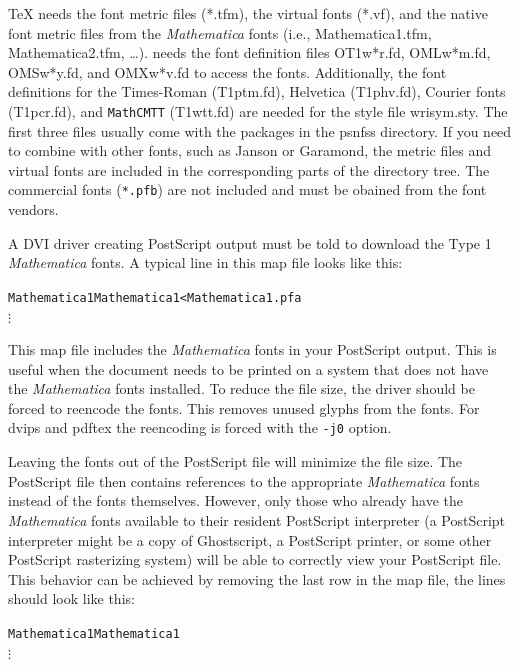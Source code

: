 \documentclass{article}
\newcommand{\Janson}[1]{{\fontfamily{pjn}\fontencoding{T1}%
\fontshape{n}\selectfont #1}}
\newcommand{\Garamond}[1]{{\fontfamily{pad}\fontencoding{T1}%
\fontshape{n}\selectfont #1}}
\newcommand{\cmtt}{\texttt{MathCMTT}\xspace}
\newcommand{\Math}{\textit{Mathematica}\xspace}
\begin{document}
\begin{sloppypar}
\TeX{} needs the font metric files (\textsf{*.tfm}), the virtual fonts
(\textsf{*.vf}), and the native font metric files from the \Math{}
fonts (i{.}e{.}, \textsf{Mathematica1.tfm}, \textsf{Mathematica2.tfm},
\ldots).  \LaTeXe{} needs the font definition files
\textsf{OT1w*r.fd}, \textsf{OMLw*m.fd}, \textsf{OMSw*y.fd}, and
\textsf{OMXw*v.fd} to access the fonts. Additionally, the font
definitions for the Times-Roman (\textsf{T1ptm.fd}), Helvetica
(\textsf{T1phv.fd}), Courier fonts (\textsf{T1pcr.fd}), and \cmtt
(\textsf{T1wtt.fd}) are needed for the style file
\textsf{wrisym.sty}. The first three files usually come with the
\LaTeXe{} packages in the \textsf{psnfss} directory.  If you need to
combine with other fonts, such as \Janson{Janson} or
\Garamond{Garamond}, the metric files and virtual fonts are included
in the corresponding parts of the directory tree.  The commercial
fonts (\texttt{*.pfb}) are not included and must be obained from the
font vendors.
\end{sloppypar}

A DVI driver creating PostScript output must be told to download the
Type 1 \Math{} fonts.  A typical line in this map file looks like
this:
\begin{alltt}
Mathematica1 Mathematica1 <Mathematica1.pfa
\(\vdots\)
\end{alltt}

This map file includes the \Math{} fonts in your PostScript
output.  This is useful when the document needs to be printed on a
system that does not have the \Math fonts installed. To reduce the
file size, the driver should be forced to reencode the fonts. This
removes unused glyphs from the fonts. For \textsf{dvips} and
\textsf{pdftex} the reencoding is forced with the \texttt{-j0} option.

Leaving the fonts out of the PostScript file will minimize the file
size.  The PostScript file then contains references to the appropriate
\Math{} fonts instead of the fonts themselves.  However, only
those who already have the \Math{} fonts available to their
resident PostScript interpreter (a PostScript interpreter might be a
copy of Ghostscript, a PostScript printer, or some other PostScript
rasterizing system) will be able to correctly view your PostScript
file. This behavior can be achieved by removing the last row in the
map file, the lines should look like this:
\begin{alltt}
Mathematica1 Mathematica1 
\(\vdots\)
\end{alltt}
\end{document}
